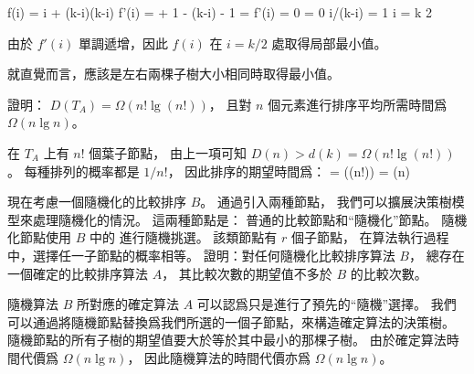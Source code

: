 \startANSWER
\startsplitformula\startmathalignment
\NC f(i) \NC= i + (k-i)\lg(k-i) \NR
\NC f'(i) \NC=  + 1 - \lg(k-i) - 1 = \lg{} \NR
\NC f'(i) = 0 \NC \Leftrightarrow \lg{} = 0 \Rightarrow i/(k-i) = 1 \Rightarrow i = \frac k 2 \NR
\stopmathalignment\stopsplitformula

由於 $f'(i)$ 單調遞增，因此 $f(i)$ 在 $i=k/2$ 處取得局部最小值。

就直覺而言，應該是左右兩棵子樹大小相同時取得最小值。
\stopANSWER

\startigBase[a,continue]\startitem
證明： $D(T_A)=\Omega(n!\lg(n!))$，
且對 $n$ 個元素進行排序平均所需時間爲 $\Omega(n\lg{n})$。
\stopitem\stopigBase

\startANSWER
在 $T_A$ 上有 $n!$ 個葉子節點，
由上一項可知 $D(n)>d(k)=\Omega(n!\lg(n!))$。
每種排列的概率都是 $1/n!$，
因此排序的期望時間爲：
\startformula
{} = \Omega(\lg(n!)) = \Omega(n)
\stopformula
\stopANSWER

現在考慮一個隨機化的比較排序 $B$。
通過引入兩種節點，
我們可以擴展決策樹模型來處理隨機化的情況。
這兩種節點是：
普通的比較節點和“隨機化”節點。
隨機化節點使用 $B$ 中的  進行隨機挑選。
該類節點有 $r$ 個子節點，
在算法執行過程中，選擇任一子節點的概率相等。
\startigBase[a,continue]\startitem
證明：對任何隨機化比較排序算法 $B$，
總存在一個確定的比較排序算法 $A$，
其比較次數的期望值不多於 $B$ 的比較次數。
\stopitem\stopigBase

\startANSWER
隨機算法 $B$ 所對應的確定算法 $A$ 可以認爲只是進行了預先的“隨機”選擇。
我們可以通過將隨機節點替換爲我們所選的一個子節點，來構造確定算法的決策樹。
隨機節點的所有子樹的期望值要大於等於其中最小的那棵子樹。
由於確定算法時間代價爲 $\Omega(n\lg{n})$，
因此隨機算法的時間代價亦爲 $\Omega(n\lg{n})$。
\stopANSWER

\stopPROBLEM
